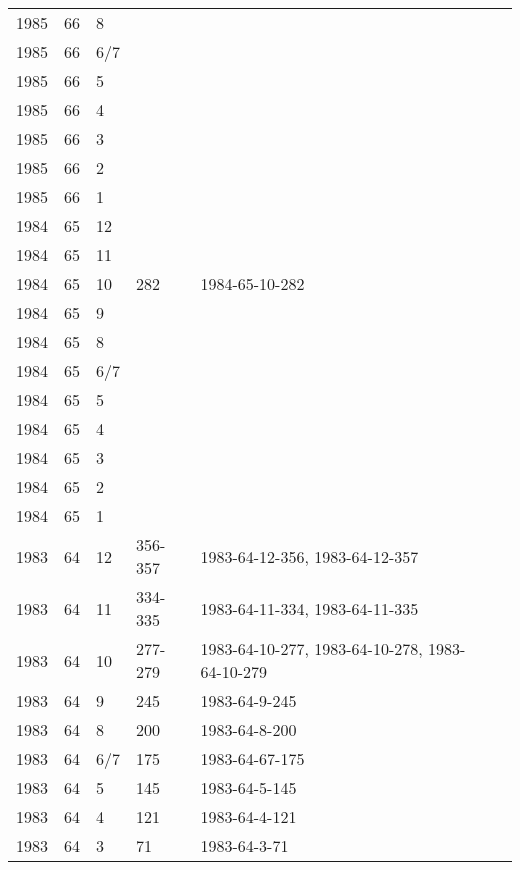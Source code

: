 \begin{longtable}{ |l|l|l|l|p{2.7cm}|l|p{2cm}| }
 1985 & 66 &     8 &         &                &  & \\
 1985 & 66 &   6/7 &         &                &  & \\
 1985 & 66 &     5 &         &                &  & \\
 1985 & 66 &     4 &         &                &  & \\
 1985 & 66 &     3 &         &                &  & \\
 1985 & 66 &     2 &         &                &  & \\
 1985 & 66 &     1 &         &                &  & \\
 1984 & 65 &    12 &         &                &  & \\
 1984 & 65 &    11 &         &                &  & \\
 1984 & 65 &    10 &     282 & 1984-65-10-282 &  & \\
 1984 & 65 &     9 &         &                &  & \\
 1984 & 65 &     8 &         &                &  & \\
 1984 & 65 &   6/7 &         &                &  & \\
 1984 & 65 &     5 &         &                &  & \\
 1984 & 65 &     4 &         &                &  & \\
 1984 & 65 &     3 &         &                &  & \\
 1984 & 65 &     2 &         &                &  & \\
 1984 & 65 &     1 &         &                &  & \\
 1983 & 64 &    12 & 356-357 &  1983-64-12-356, 1983-64-12-357 &  & \\
 1983 & 64 &    11 & 334-335 & 1983-64-11-334, 1983-64-11-335 &  & \\
 1983 & 64 &    10 & 277-279 & 1983-64-10-277, 1983-64-10-278, 1983-64-10-279 &  & \\
 1983 & 64 &     9 &   245   & 1983-64-9-245  &  & \\
 1983 & 64 &     8 &    200  & 1983-64-8-200  &  & \\
 1983 & 64 &   6/7 &   175   & 1983-64-67-175 &  & \\
 1983 & 64 &     5 &   145   & 1983-64-5-145  &  & \\
 1983 & 64 &     4 &    121  & 1983-64-4-121  &  & \\
 1983 & 64 &     3 &     71  & 1983-64-3-71   &  & \\

\end{longtable}
